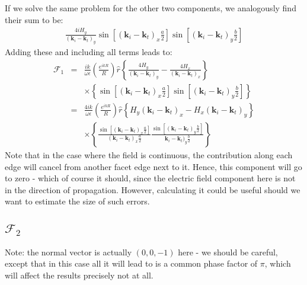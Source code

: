 \documentclass[a4article,12pt]{article}
\newcommand{\kvec}[0]{{\mathbf k}}
\begin{document}
%
If we solve the same problem for the other two components, we analogously find their sum to be:
%
\begin{eqnarray}
\frac{4 i H_y}{(\kvec_i - \kvec_t)_y}  \sin \left[ (\kvec_i - \kvec_t)_x \frac{a}{2} \right] \sin \left[ (\kvec_i - \kvec_t)_y \frac{b}{2} \right]
\end{eqnarray}
%
Adding these and including all terms leads to:
%
\begin{eqnarray}
{\mathcal F}_1 & = & \frac{i k}{\omega \epsilon} \left(\frac{e^{i k R}}{R} \right) \hat{r} \left\{ \frac{4 H_y}{(\kvec_i - \kvec_t)_y} - \frac{4 H_x}{(\kvec_i - \kvec_t)_x} \right\}  \\
&& \times \left\{ \sin \left[ (\kvec_i - \kvec_t)_x \frac{a}{2} \right] \sin \left[ (\kvec_i - \kvec_t)_y \frac{b}{2} \right] \right\} \\
& = & \frac{4 i k}{\omega \epsilon} \left(\frac{e^{i k R}}{R} \right) \hat{r} \left\{ H_y (\kvec_i - \kvec_t)_x - H_x (\kvec_i - \kvec_t)_y \right\}  \\
&& \times \left\{ \frac{ \sin \left[ (\kvec_i - \kvec_t)_x \frac{a}{2} \right]}{(\kvec_i - \kvec_t)_x \frac{a}{2} } \frac{ \sin \left[ (\kvec_i - \kvec_t)_y \frac{b}{2} \right] }{\kvec_i - \kvec_t)_y \frac{b}{2} } \right\}
\end{eqnarray}
%
Note that in the case where the field is continuous, the contribution along each edge will cancel from another facet edge next to it. Hence, this component will go to zero - which of course it should, since the electric field component here is not in the direction of propagation. However, calculating it could be useful should we want to estimate the size of such errors.

\subsection{${\mathcal F}_2$}

Note: the normal vector is actually $(0,0,-1)$ here - we should be careful, except that in this case all it will lead to is a common phase factor of $\pi$, which will affect the results precisely not at all.
\end{document}
